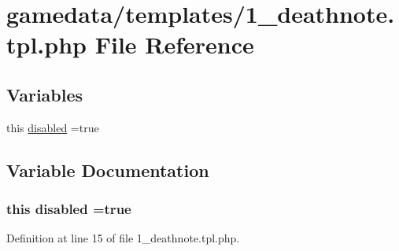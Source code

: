 \hypertarget{1__deathnote_8tpl_8php}{\section{gamedata/templates/1\+\_\+deathnote.tpl.\+php File Reference}
\label{1__deathnote_8tpl_8php}
}
\subsection*{Variables}
\begin{DoxyCompactItemize}
\item 
this \hyperlink{1__deathnote_8tpl_8php_a5954796dd8b0e54067ec29be2f8c5cf3}{disabled} =true
\end{DoxyCompactItemize}


\subsection{Variable Documentation}
\hypertarget{1__deathnote_8tpl_8php_a5954796dd8b0e54067ec29be2f8c5cf3}{
\subsubsection[{disabled}]{\setlength{\rightskip}{0pt plus 5cm}this disabled =true}}\label{1__deathnote_8tpl_8php_a5954796dd8b0e54067ec29be2f8c5cf3}


Definition at line 15 of file 1\+\_\+deathnote.\+tpl.\+php.


